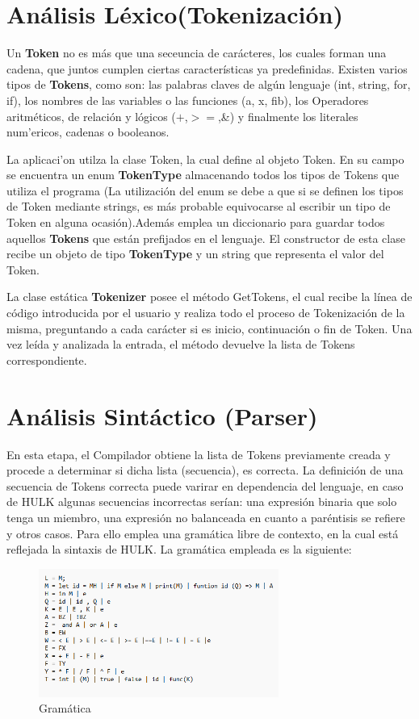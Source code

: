 \documentclass[10pt,a4paper]{article}
\begin{document}
\section{An\'alisis L\'exico(Tokenizaci\'on)}
Un \textbf{Token} no es m\'as que una seceuncia de car\'acteres, los cuales forman una cadena, que juntos cumplen ciertas caracter\'isticas ya predefinidas. Existen varios tipos de \textbf{Tokens}, como son: las palabras claves de alg\'un lenguaje (int, string, for, if), los nombres de las variables o las funciones (a, x, fib), los Operadores aritm\'eticos, de relaci\'on y l\'ogicos ($+$,$>=$,\&) y finalmente los literales num'ericos, cadenas o booleanos. 

La aplicaci'on utilza la clase Token, la cual define al objeto Token. En su campo se encuentra un enum \textbf{TokenType} almacenando todos los tipos de Tokens que utiliza el programa (La utilizaci\'on del enum se debe a que si se definen los tipos de Token mediante strings, es m\'as probable equivocarse al escribir un tipo de Token en alguna ocasi\'on).Adem\'as emplea un diccionario para guardar todos aquellos \textbf{Tokens} que est\'an prefijados en el lenguaje. El constructor de esta clase recibe un objeto de tipo \textbf{TokenType} y un string que representa el valor del Token. 

La clase est\'atica \textbf{Tokenizer} posee el m\'etodo GetTokens, el cual recibe la l\'inea de c\'odigo introducida por el usuario y realiza todo el proceso de Tokenizaci\'on de la misma, preguntando a cada car\'acter si es inicio, continuaci\'on o fin de Token. Una vez le\'ida y analizada la entrada, el m\'etodo devuelve la lista de Tokens correspondiente.

\section{An\'alisis Sint\'actico (Parser)}
En esta etapa, el Compilador obtiene la lista de Tokens previamente creada y procede a determinar si dicha lista (secuencia), es correcta. La definici\'on de una secuencia de Tokens correcta puede varirar en dependencia del lenguaje, en caso de HULK algunas secuencias incorrectas ser\'ian: una expresi\'on binaria que solo tenga un miembro, una expresi\'on no balanceada en cuanto a par\'entisis se refiere y otros casos. Para ello emplea una gram\'atica libre de contexto, en la cual est\'a reflejada la sintaxis de HULK. La gram\'atica empleada es la siguiente:\\

\begin{figure}[!h] \label{Gramatica}
\centering
\includegraphics[width = 0.7\textwidth]{Gramatica.png}
\caption{Gram\'atica}
\end{figure}
\end{document}
